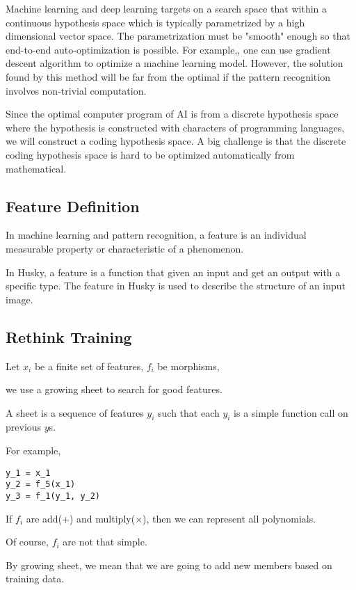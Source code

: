 \documentclass[11pt]{article} 	%
\theoremstyle{definition}
\begin{document}
Machine learning and deep learning targets on a search space that within a continuous hypothesis space which is typically parametrized by a high dimensional vector space.  The parametrization must be "smooth" enough so that end-to-end auto-optimization is possible.  For example,, one can use gradient descent algorithm to optimize a machine learning model. However, the solution found by this method will be far from the optimal if the pattern recognition involves non-trivial computation.  

Since the optimal computer program of AI is from a discrete hypothesis space where the hypothesis is constructed with characters of programming languages, we will construct a coding hypothesis space. A big challenge is that the  discrete coding hypothesis space is hard to be optimized automatically from mathematical. 
\subsection{Feature Definition}
In machine learning and pattern recognition, a feature is an individual measurable property or characteristic of a phenomenon\cite{bishop2006pattern}. 

In Husky, a feature is a function that given an input and get an output with a specific type.  The feature in Husky is used to describe the structure of an input image.  

\subsection{Rethink Training}

Let $x_i$ be a finite set of features, $f_i$ be morphisms,

we use a growing sheet to search for good features.

A sheet is a sequence of features $y_i$ such that each $y_i$ is a simple function call on previous $y$s.

For example,

\begin{verbatim}
y_1 = x_1
y_2 = f_5(x_1)
y_3 = f_1(y_1, y_2)
\end{verbatim}


If $f_i$ are add(+) and multiply($\times$), then we can represent all polynomials.

Of course, $f_i$ are not that simple.

By growing sheet, we mean that we are going to add new members based on training data.
\end{document}
